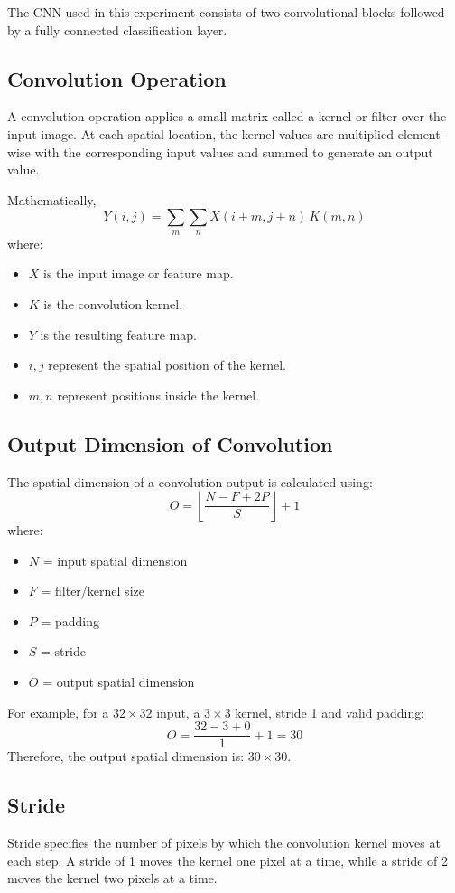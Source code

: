 \documentclass[11pt]{article}
\begin{document}
The CNN used in this experiment consists of two convolutional blocks followed by a fully connected classification layer.

\subsection{Convolution Operation}
A convolution operation applies a small matrix called a kernel or filter over the input image. At each spatial location, the kernel values are multiplied element-wise with the corresponding input values and summed to generate an output value.

Mathematically,
\[
Y(i,j) = \sum_m \sum_n X(i+m, j+n)\,K(m,n)
\]
where:
\begin{itemize}
    \item $X$ is the input image or feature map.
    \item $K$ is the convolution kernel.
    \item $Y$ is the resulting feature map.
    \item $i, j$ represent the spatial position of the kernel.
    \item $m, n$ represent positions inside the kernel.
\end{itemize}

\subsection{Output Dimension of Convolution}
The spatial dimension of a convolution output is calculated using:
\[
O = \left\lfloor \frac{N - F + 2P}{S} \right\rfloor + 1
\]
where:
\begin{itemize}
    \item $N$ = input spatial dimension
    \item $F$ = filter/kernel size
    \item $P$ = padding
    \item $S$ = stride
    \item $O$ = output spatial dimension
\end{itemize}

For example, for a $32 \times 32$ input, a $3 \times 3$ kernel, stride 1 and valid padding:
\[
O = \frac{32 - 3 + 0}{1} + 1 = 30
\]
Therefore, the output spatial dimension is: $30 \times 30$.

\subsection{Stride}
Stride specifies the number of pixels by which the convolution kernel moves at each step. A stride of 1 moves the kernel one pixel at a time, while a stride of 2 moves the kernel two pixels at a time.
\end{document}
